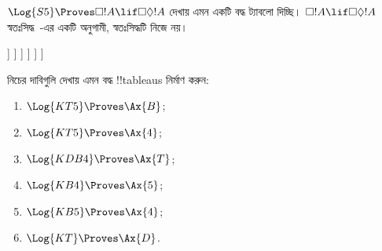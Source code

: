 \documentclass[../../../include/open-logic-section]{subfiles}
\begin{document}
\begin{ex}
  $\Log{S5} \Proves \Box!A \lif \Box\Diamond!A$ দেখায় এমন একটি
  বদ্ধ ট্যাবলো দিচ্ছি। $\Box!A \lif \Box\Diamond!A$
  স্বতঃসিদ্ধ~-এর একটি অনুগামী, স্বতঃসিদ্ধটি নিজে নয়।
  \begin{oltableau}
    [\pFmla{\False}{\Box\formula{A} \lif \Box\Diamond \formula{A}}{1},
      just = \TAss
      [\pFmla{\True}{\Box \formula{A}}{1}, just = {\TRule{\False}{\lif}[1]}
        [\pFmla{\False}{\Box\Diamond \formula{A}}{1},
          just = {\TRule{\False}{\lif}[1]}
          [\pFmla{\False}{\Diamond \formula{A}}{1.1},
            just = {\TRule{\False}{\Box}[3]}
            [\pFmla{\False}{\Diamond \formula{A}}{1},
              just = {4r$\Diamond$ 4}
              [\pFmla{\False}{\formula{A}}{1.1},
                just = {\TRule{\False}{\Diamond}[5]}
                [\pFmla{\True}{\formula{A}}{1.1},
                  just = {\TRule{\True}{\Box}[2]}, close]
              ]
            ]
          ]
        ]
      ]
    ]
  \end{oltableau}
\end{ex}

\begin{prob}
নিচের দাবিগুলি দেখায় এমন বদ্ধ !!{tableau}s নির্মাণ করুন:
  \begin{enumerate}
  \item $\Log{KT5} \Proves \Ax{B}$;
  \item $\Log{KT5} \Proves \Ax{4}$;
  \item $\Log{KDB4} \Proves \Ax{T}$;
  \item $\Log{KB4} \Proves \Ax{5}$;
  \item $\Log{KB5} \Proves \Ax{4}$;
  \item $\Log{KT} \Proves \Ax{D}$.
  \end{enumerate}
\end{prob}
\end{document}
